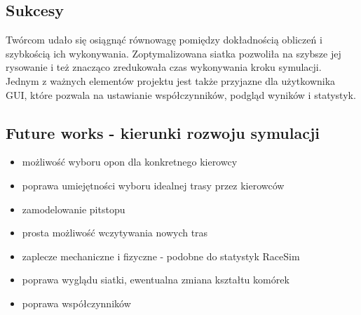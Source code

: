 \documentclass{article}
\begin{document}
\subsection{Sukcesy}
Twórcom udało się osiągnąć równowagę pomiędzy dokładnością obliczeń i szybkością ich wykonywania. Zoptymalizowana siatka pozwoliła na szybsze jej rysowanie i też znacząco zredukowała czas wykonywania kroku symulacji. \\

Jednym z ważnych elementów projektu jest także przyjazne dla użytkownika GUI, które pozwala na ustawianie współczynników, podgląd wyników i statystyk. 

\subsection{Future works - kierunki rozwoju symulacji}
\begin{itemize}
\item możliwość wyboru opon dla konkretnego kierowcy
\item poprawa umiejętności wyboru idealnej trasy przez kierowców
\item zamodelowanie pitstopu
\item prosta możliwość wczytywania nowych tras
\item zaplecze mechaniczne i fizyczne - podobne do statystyk RaceSim \cite{race}
\item poprawa wyglądu siatki, ewentualna zmiana kształtu komórek
\item poprawa współczynników
\end{itemize}



\end{document}
